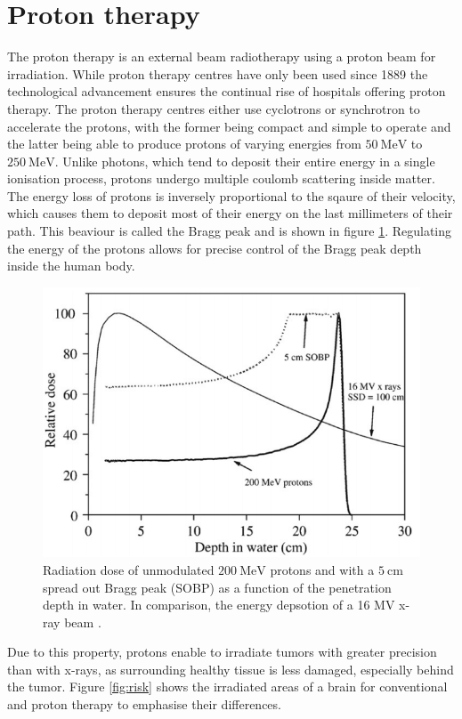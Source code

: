 \section{Proton therapy}
The proton therapy is an external beam radiotherapy using a proton beam for irradiation. While proton therapy centres have only been used since 1889 the technological
advancement ensures the continual rise of hospitals offering proton therapy.
The proton therapy centres either use cyclotrons or synchrotron to accelerate the protons, with the former being compact and simple to operate and the latter being able
to produce protons of varying energies from $\SI{50}{\MeV}$ to $\SI{250}{\MeV}$.
Unlike photons, which tend to deposit their entire energy in a single ionisation process, protons undergo multiple coulomb scattering inside matter. The
energy loss of protons is inversely proportional to the sqaure of their velocity, which causes them to deposit most of their energy on the last millimeters of their path.
This beaviour is called the Bragg peak and is shown in figure \ref{fig:bragg}. Regulating the energy of the protons allows for precise control of the Bragg peak depth inside
the human body.

\begin{figure}
  \centering
  \includegraphics[height=0.6\textwidth]{images/tiefendosis.png}
  \caption{Radiation dose of unmodulated $\SI{200}{\mega\eV}$ protons and with a $\SI{5}{\centi\meter}$ spread out Bragg peak (SOBP)
  as a function of the penetration depth in water. In comparison, the energy depsotion of a 16 MV x-ray beam \cite{bragg}.}
  \label{fig:bragg}
\end{figure}
Due to this property, protons enable to irradiate tumors with greater precision than with
x-rays, as surrounding healthy tissue is less damaged, especially behind the tumor. Figure \ref{fig:risk} shows the irradiated areas of a brain for conventional and
proton therapy to emphasise their differences.

